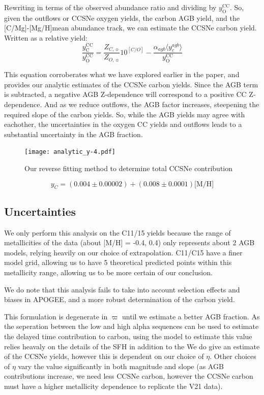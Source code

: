 \documentclass[fleqn,usenatbib]{mnras}
\newcommand{\caah}{[C/Mg]-[Mg/H]}
\begin{document}
Rewriting in terms of the observed abundance ratio and dividing by
$y_\text{O}^\text{CC}$. So, given the outflows or CCSNe oxygen yields, the
carbon AGB yield, and the \caah mean abundance track, we can estimate the CCSNe carbon yield. Written as a relative yield:
\begin{equation}
    \frac{y_\text{C}^\text{CC}}{y_\text{O}^\text{CC}} = \frac{Z_{C, \sun}}{Z_{O, \sun}} 10^{[C/O]} - \frac{\alpha_{agb} \langle y_c^{agb} \rangle}{ y_\text{O}^\text{CC}}
\end{equation}

This equation corroberates what we have explored earlier in the paper, and provides our analytic estimates of the CCSNe carbon yields. Since the AGB term is subtracted, a negative AGB Z-dependence will correspond to a positive CC Z-dependence. And as we reduce outflows, the AGB factor increases, steepening the required slope of the carbon yields. So, while the AGB yields may agree with eachother, the uncertainties in the oxygen CC yields and outflows leads to a substantial uncertainty in the AGB fraction.  

\begin{figure}
    \centering
    \texttt{[image: analytic\_y-4.pdf]}
    \caption{Our reverse fitting method to determine total CCSNe contribution}
\end{figure}

\begin{equation}
    y_C = (0.004 \pm 0.00002) + (0.008 \pm 0.0001) \text{[M/H]} 
\end{equation}

\subsection{Uncertainties}

We only perform this analysis on the C11/15 yields because the range of metallicities of the data (about [M/H] = -0.4, 0.4) only represents about 2 AGB models, relying heavily on our choice of extrapolation. C11/C15 have a finer model grid, allowing us to have 5 theoretical predicted points within this metallicity range, allowing us to be more certain of our conclusion. 

We do note that this analysis fails to take into account selection effects and biases in APOGEE, and a more robust determination of the carbon yield. 


This formulation is degenerate in $\varpi$ until we estimate a better AGB fraction. As the seperation between the low and high alpha sequences can be used to estimate the delayed time contribution to carbon, using the model to estimate this value relies heavaly on the details of the SFH in addition to the 
We do give an estimate of the CCSNe yields, however this is dependent on our choice of $\eta$. Other choices of $\eta$ vary the value significantly in both magnitude and slope (as AGB contributions increase, we need less CCSNe carbon, however the CCSNe carbon must have a higher metallicity dependence to replicate the V21 data). 
\end{document}
